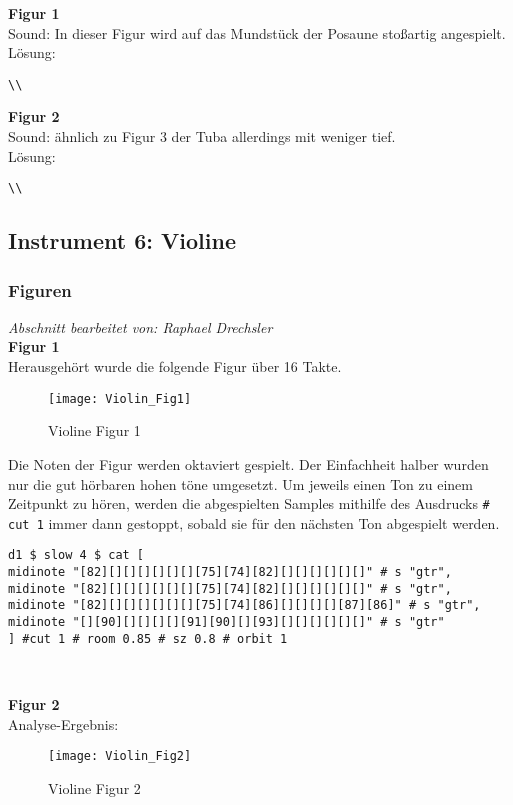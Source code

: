\documentclass[
10pt, %
a4paper, %
oneside, %
headinclude,footinclude, %
BCOR5mm, %
]{scrartcl}
\begin{document}
\noindent\textbf{Figur 1}\\
 Sound: In dieser Figur wird auf das Mundstück der Posaune stoßartig angespielt.\\
Lösung:\\
\begin{lstlisting}
\\
\end{lstlisting}

\noindent\textbf{Figur 2}\\
Sound: ähnlich zu Figur 3 der Tuba allerdings mit weniger tief.\\
Lösung:\\
\begin{lstlisting}
\\
\end{lstlisting}

\subsection{Instrument 6: Violine}
\subsubsection{Figuren}
\textit{Abschnitt bearbeitet von: Raphael Drechsler}\\

\noindent\textbf{Figur 1}\\
Herausgehört wurde die folgende Figur über 16 Takte.
\begin{figure}[h]
	\centering 
	\texttt{[image: Violin\_Fig1]} 
	\caption{Violine Figur 1}
\end{figure}

\noindent Die Noten der Figur werden oktaviert gespielt. Der Einfachheit halber wurden nur die gut hörbaren hohen töne umgesetzt. Um jeweils einen Ton zu einem Zeitpunkt zu hören, werden die abgespielten Samples mithilfe des Ausdrucks \verb|# cut 1| immer dann gestoppt, sobald sie für den nächsten Ton abgespielt werden.\cite{tid12}

\begin{lstlisting}
d1 $ slow 4 $ cat [
midinote "[82][][][][][][][75][74][82][][][][][][]" # s "gtr",
midinote "[82][][][][][][][75][74][82][][][][][][]" # s "gtr",
midinote "[82][][][][][][][75][74][86][][][][][87][86]" # s "gtr",
midinote "[][90][][][][][91][90][][93][][][][][][]" # s "gtr"
] #cut 1 # room 0.85 # sz 0.8 # orbit 1 
\end{lstlisting}\

\noindent\textbf{Figur 2}\\
Analyse-Ergebnis:
\begin{figure}[h]
	\centering 
	\texttt{[image: Violin\_Fig2]} 
	\caption{Violine Figur 2}
\end{figure}
\end{document}
